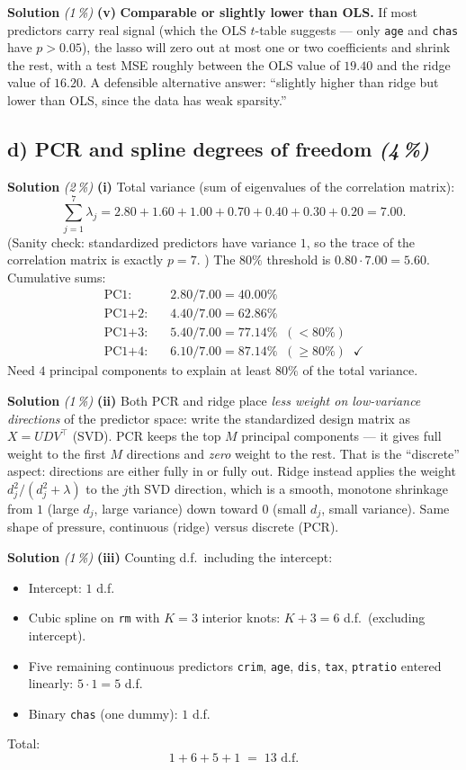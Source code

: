 \documentclass[11pt,a4paper]{article}
\newcommand{\subpoints}[1]{\textit{(#1\,\%)}}
\newcommand{\sol}{\noindent\textbf{Solution}}
\begin{document}
\medskip
\sol{} \subpoints{1} \textbf{(v)} \textbf{Comparable or slightly lower than OLS.} If most predictors carry
real signal (which the OLS $t$-table suggests --- only \texttt{age} and \texttt{chas} have $p>0.05$), the
lasso will zero out at most one or two coefficients and shrink the rest, with a test MSE roughly between
the OLS value of $19.40$ and the ridge value of $16.20$. A defensible alternative answer: ``slightly higher
than ridge but lower than OLS, since the data has weak sparsity.''

\subsection*{d) PCR and spline degrees of freedom \subpoints{4}}

\sol{} \subpoints{2} \textbf{(i)} Total variance (sum of eigenvalues of the correlation matrix):
$$\sum_{j=1}^7\lambda_j = 2.80 + 1.60 + 1.00 + 0.70 + 0.40 + 0.30 + 0.20 = 7.00.$$
(Sanity check: standardized predictors have variance $1$, so the trace of the correlation matrix is exactly
$p=7$. \checkmark) The $80\%$ threshold is $0.80\cdot 7.00 = 5.60$. Cumulative sums:
\begin{align*}
\text{PC1:}    &\quad 2.80 / 7.00 = 40.00\% \\
\text{PC1+2:}  &\quad 4.40 / 7.00 = 62.86\% \\
\text{PC1+3:}  &\quad 5.40 / 7.00 = 77.14\%\;\; (<80\%) \\
\text{PC1+4:}  &\quad 6.10 / 7.00 = 87.14\%\;\; (\geq 80\%) \;\;\checkmark
\end{align*}
Need $\boxed{4}$ principal components to explain at least $80\%$ of the total variance.

\medskip
\sol{} \subpoints{1} \textbf{(ii)} Both PCR and ridge place \emph{less weight on low-variance directions} of
the predictor space: write the standardized design matrix as $X = U D V^\top$ (SVD). PCR keeps the top $M$
principal components --- it gives full weight to the first $M$ directions and \emph{zero} weight to the rest.
That is the ``discrete'' aspect: directions are either fully in or fully out. Ridge instead applies the
weight $d_j^2/(d_j^2+\lambda)$ to the $j$th SVD direction, which is a smooth, monotone shrinkage from
$1$ (large $d_j$, large variance) down toward $0$ (small $d_j$, small variance). Same shape of pressure,
continuous (ridge) versus discrete (PCR).

\medskip
\sol{} \subpoints{1} \textbf{(iii)} Counting d.f.\ including the intercept:
\begin{itemize}
  \item Intercept: $1$ d.f.
  \item Cubic spline on \texttt{rm} with $K=3$ interior knots: $K+3=6$ d.f.\ (excluding intercept).
  \item Five remaining continuous predictors \texttt{crim}, \texttt{age}, \texttt{dis}, \texttt{tax},
        \texttt{ptratio} entered linearly: $5\cdot 1 = 5$ d.f.
  \item Binary \texttt{chas} (one dummy): $1$ d.f.
\end{itemize}
Total:
$$1 + 6 + 5 + 1 \;=\; \boxed{13}\text{ d.f.}$$
\end{document}

